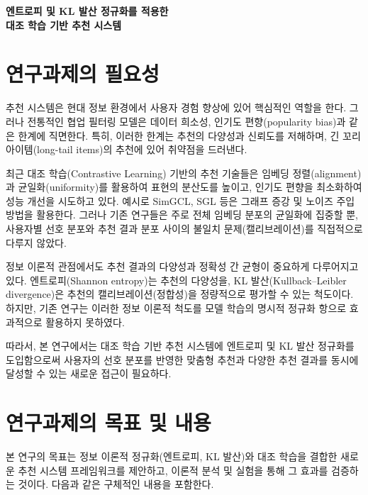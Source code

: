 \documentclass[a4paper, 12pt]{article}
\begin{document}
\begin{center}
    {\LARGE\bf 엔트로피 및 KL 발산 정규화를 적용한 \\ 대조 학습 기반 추천 시스템}\\[1em]
\end{center}


\section*{연구과제의 필요성}

추천 시스템은 현대 정보 환경에서 사용자 경험 향상에 있어 핵심적인 역할을 한다. 그러나 전통적인 협업 필터링 모델은 데이터 희소성, 인기도 편향(popularity bias)과 같은 한계에 직면한다. 특히, 이러한 한계는 추천의 다양성과 신뢰도를 저해하며, 긴 꼬리 아이템(long-tail items)의 추천에 있어 취약점을 드러낸다.

최근 대조 학습(Contrastive Learning) 기반의 추천 기술들은 임베딩 정렬(alignment)과 균일화(uniformity)를 활용하여 표현의 분산도를 높이고, 인기도 편향을 최소화하여 성능 개선을 시도하고 있다. 예시로 SimGCL, SGL 등은 그래프 증강 및 노이즈 주입 방법을 활용한다. 그러나 기존 연구들은 주로 전체 임베딩 분포의 균일화에 집중할 뿐, 사용자별 선호 분포와 추천 결과 분포 사이의 불일치 문제(캘리브레이션)를 직접적으로 다루지 않았다.

정보 이론적 관점에서도 추천 결과의 다양성과 정확성 간 균형이 중요하게 다루어지고 있다. 엔트로피(Shannon entropy)는 추천의 다양성을, KL 발산(Kullback–Leibler divergence)은 추천의 캘리브레이션(정합성)을 정량적으로 평가할 수 있는 척도이다. 하지만, 기존 연구는 이러한 정보 이론적 척도를 모델 학습의 명시적 정규화 항으로 효과적으로 활용하지 못하였다.

따라서, 본 연구에서는 대조 학습 기반 추천 시스템에 엔트로피 및 KL 발산 정규화를 도입함으로써 사용자의 선호 분포를 반영한 맞춤형 추천과 다양한 추천 결과를 동시에 달성할 수 있는 새로운 접근이 필요하다.

\section*{연구과제의 목표 및 내용}

본 연구의 목표는 정보 이론적 정규화(엔트로피, KL 발산)와 대조 학습을 결합한 새로운 추천 시스템 프레임워크를 제안하고, 이론적 분석 및 실험을 통해 그 효과를 검증하는 것이다. 다음과 같은 구체적인 내용을 포함한다.
\end{document}
